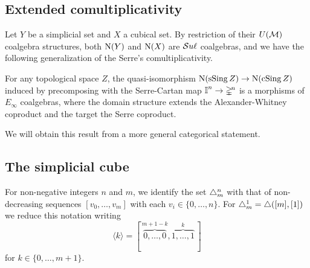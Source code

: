 \subsection{Extended comultiplicativity} \label{ss:extended comultiplicativity}

Let $Y$ be a simplicial set and $X$ a cubical set.
By restriction of their $U(\mathcal{M})$ coalgebra structures, both $\operatorname{N}(Y)$ and $\operatorname{N}(X)$ are $\mathcal{S}u\ell$ coalgebras, and we have the following generalization of the Serre's comultiplicativity. 

\begin{theorem} \label{t:extended comultiplicativity}
	For any topological space $Z$, the quasi-isomorphism $\operatorname{N}(\operatorname{sSing} Z) \to \operatorname{N}(\operatorname{cSing} Z)$ induced by precomposing with the Serre-Cartan map $\bm{\mathbb{I}}^n \to \mathbb{\Delta}^{\!n}$ is a morphisms of $E_\infty$ coalgebras, where the domain structure extends the Alexander-Whitney coproduct and the target the Serre coproduct.
\end{theorem}

We will obtain this result from a more general categorical statement.

\subsection{The simplicial cube} \label{ss:the simplicial cube}

For non-negative integers $n$ and $m$, we identify the set $\triangle^n_m$ with that of non-decreasing sequences $[v_0, \dots, v_m]$ with each $v_i \in \{0, \dots, n\}$.
For $\triangle^1_m = \triangle([m], [1])$ we reduce this notation writing
\begin{equation*}
\langle k \rangle = [\, \overbrace{0, \dots, 0}^{m+1-k}, \overbrace{1, \dots, 1}^{k}\,]
\end{equation*}
for $k \in \{0, \dots, m+1\}$.

